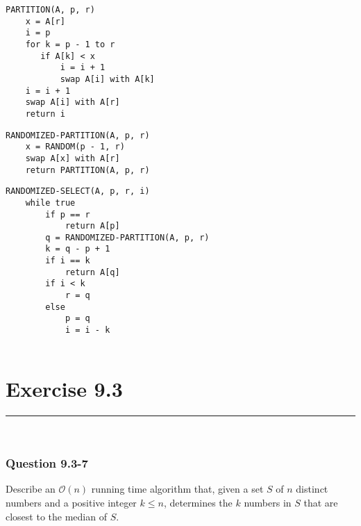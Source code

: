 \documentclass[11pt]{article}
\begin{document}
\begin{center}  
\begin{multicols}{2}
\begin{mdframed}[backgroundcolor=gray!5]
\begin{lstlisting}
PARTITION(A, p, r)
    x = A[r]
    i = p
    for k = p - 1 to r
       if A[k] < x
           i = i + 1
           swap A[i] with A[k]
    i = i + 1
    swap A[i] with A[r]
    return i
\end{lstlisting}
\end{mdframed}    

\begin{mdframed}[backgroundcolor=gray!5]
\begin{lstlisting}    
RANDOMIZED-PARTITION(A, p, r)
    x = RANDOM(p - 1, r)
    swap A[x] with A[r]
    return PARTITION(A, p, r)
\end{lstlisting}
\end{mdframed}
\columnbreak

\begin{mdframed}[backgroundcolor=gray!5]

\begin{lstlisting}
RANDOMIZED-SELECT(A, p, r, i)
    while true
        if p == r
            return A[p]
        q = RANDOMIZED-PARTITION(A, p, r)
        k = q - p + 1
        if i == k
            return A[q]
        if i < k
            r = q
        else
            p = q
            i = i - k
    
\end{lstlisting}
\end{mdframed}
\end{multicols}

\end{center}

\newpage
\section*{Exercise 9.3}\nointerlineskip
\noindent \rule{\linewidth}{0.01pt}\\
\subsubsection*{Question 9.3-7}\nointerlineskip
Describe an $\mathcal{O}(n)$ running time algorithm that, given a set $S$ of $n$ distinct numbers and a positive integer $k \leq n$, determines the $k$ numbers in $S$ that are closest to the median of $S$.\\
\end{document}
